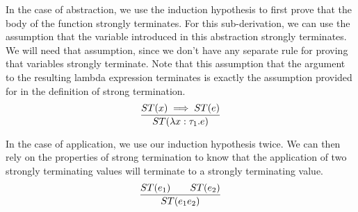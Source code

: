 \documentclass{article}
\begin{document}
In the case of abstraction, we use the induction hypothesis to first prove that
the body of the function strongly terminates.  For this sub-derivation, we can
use the assumption that the variable introduced in this abstraction strongly
terminates.  We will need that assumption, since we don't have any separate
rule for proving that variables strongly terminate.
Note that this assumption that the argument to the resulting lambda expression
terminates is exactly the assumption provided for in the definition of strong
termination.
\[
\frac{ST(x) \implies ST(e)}
{%
ST(\lambda x:\tau_1.e) }
\]

In the  case of application, we use our induction hypothesis twice.  We can
then rely on the properties of strong termination to know that the application
of two strongly terminating values will terminate to a strongly terminating
value.
\[
\frac{ST(e_1)%
\qquad
ST(e_2)%
}
{%
ST(e_1 e_2)}
\]
\end{document}
